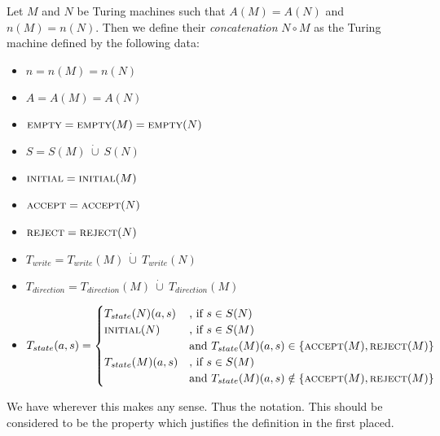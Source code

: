 \begin{Definition}
	Let $M$ and $N$ be Turing machines such that $A(M) = A(N)$ and $n(M) = n(N)$. Then we define their \emph{concatenation} $N \circ M$ as the Turing machine defined by the following data:
	\begin{itemize}
		\item{$n = n(M) = n(N)$}
		\item{$A = A(M) = A(N)$}
		\item{$\text{\scshape{empty}} = \text{\scshape{empty}}(M) = \text{\scshape{empty}}(N)$}
		\item{$S = S(M)~\dot\cup~S(N)$}
		\item{$\text{\scshape{initial}} = \text{\scshape{initial}}(M)$}
		\item{$\text{\scshape{accept}} = \text{\scshape{accept}}(N)$}
		\item{$\text{\scshape{reject}} = \text{\scshape{reject}}(N)$}
		\item{$T_{write} = T_{write}(M)~\dot\cup~T_{write}(N)$}
		\item{$T_{direction} = T_{direction}(M)~\dot\cup~T_{direction}(M)$}
		\item{$T_{state} (a,s) =
			\begin{cases}
				T_{state}(N) (a,s) &\text{, if}~s \in S(N) \\
				\text{\scshape{initial}}(N) &\text{, if}~s \in S(M) \\&\text{and}~T_{state}(M)(a,s) \in \{\text{\scshape{accept}}(M),\text{\scshape{reject}}(M)\} \\
				T_{state}(M) (a,s) &\text{, if}~s \in S(M) \\&\text{and}~T_{state}(M)(a,s) \notin \{\text{\scshape{accept}}(M),\text{\scshape{reject}}(M)\}
			\end{cases}
		$}
	\end{itemize}
\end{Definition}
\remark We have  wherever this makes any sense. Thus the notation.
This should be considered to be the property which justifies the definition in the first placed.
